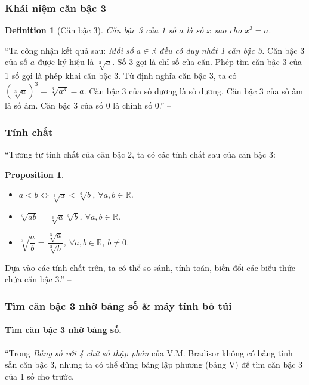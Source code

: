 \documentclass{article}
\numberwithin{equation}{section}
\newtheorem{definition}{Definition}[section]
\newtheorem{proposition}{Proposition}[section]
\begin{document}
\subsubsection{Khái niệm căn bậc 3}
\begin{definition}[Căn bậc 3]
	\emph{Căn bậc 3} của 1 số $a$ là số $x$ sao cho $x^3 = a$.
\end{definition}
``Ta công nhận kết quả sau: \textit{Mỗi số $a\in\mathbb{R}$ đều có duy nhất 1 căn bậc 3.} Căn bậc 3 của số $a$ được ký hiệu là $\sqrt[3]{a}$. Số 3 gọi là chỉ số của căn. Phép tìm căn bậc 3 của 1 số gọi là phép khai căn bậc 3. Từ định nghĩa căn bậc 3, ta có $\left(\sqrt[3]{a}\right)^3 = \sqrt[3]{a^3} = a$. Căn bậc 3 của số dương là số dương. Căn bậc 3 của số âm là số âm. Căn bậc 3 của số 0 là chính số 0.'' -- \cite[p. 35]{SGK_Toan_9_tap_1}

\subsubsection{Tính chất}
``Tương tự tính chất của căn bậc 2, ta có các tính chất sau của căn bậc 3:

\begin{proposition}
	\begin{itemize}
		\item[(a)] $a < b\Leftrightarrow\sqrt[3]{a} < \sqrt[3]{b}$, $\forall a,b\in\mathbb{R}$.
		\item[(b)] $\sqrt[3]{ab} = \sqrt[3]{a}\sqrt[3]{b}$, $\forall a,b\in\mathbb{R}$.
		\item[(c)] $\sqrt[3]{\dfrac{a}{b}} = \dfrac{\sqrt[3]{a}}{\sqrt[3]{b}}$, $\forall a,b\in\mathbb{R}$, $b\ne 0$.
	\end{itemize}
\end{proposition}
Dựa vào các tính chất trên, ta có thể so sánh, tính toán, biến đổi các biểu thức chứa căn bậc 3.'' -- \cite[p. 35]{SGK_Toan_9_tap_1}

\subsubsection{Tìm căn bậc 3 nhờ bảng số \& máy tính bỏ túi}

\paragraph{Tìm căn bậc 3 nhờ bảng số.} ``Trong \textit{Bảng số với 4 chữ số thập phân} của V.M. Bradisor không có bảng tính sẵn căn bậc 3, nhưng ta có thể dùng bảng lập phương (bảng V) để tìm căn bậc 3 của 1 số cho trước.
\end{document}
